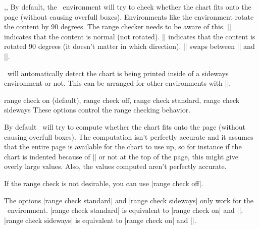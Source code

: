 \begin{sseqdata}[name = basic, cohomological Serre grading]
\begin{commandlist}{
    \SseqOrientationNormal,\SseqOrientationSideways,\SseqOrientationToggle
}
By default, the \sseqpageenv\ environment will try to check whether the chart
fits onto the page (without causing overfull boxes). Environments like the
 environment rotate the content by 90 degrees. The range checker
needs to be aware of this. |\SseqOrientationNormal| indicates that the content is
normal (not rotated). |\SseqOrientationSideways| indicates that the content is
rotated 90 degrees (it doesn't matter in which direction). |\SseqOrientationToggle|
swaps between |\SseqOrientationNormal| and |\SseqOrientationSideways|.

\sseqpages\ will automatically detect the chart is being printed inside of a
sideways environment or not. This can be arranged for other environments with
||.
\end{commandlist}
\begin{keylist}{range check on (default), range check off, range check standard, range check sideways}
These options control the range checking behavior.

By default \sseqpages\ will try to compute whether the chart fits onto the page
(without causing overfull boxes). The computation isn't perfectly accurate and
it assumes that the entire page is available for the chart to use up, so for
instance if the chart is indented because of |\textindent| or not at the top of
the page, this might give overly large values. Also, the values computed aren't
perfectly accurate.

If the range check is not desirable, you can use |range check off|.

The options |range check standard| and |range check sideways| only work for the
\sseqpageenv\ environment. |range check standard| is equivalent to |range check on| 
and |\SseqOrientationNormal|. |range check sideways| is equivalent to |range check on| 
and |\SseqOrientationSideways|.
\end{keylist}


\end{sseqdata}
